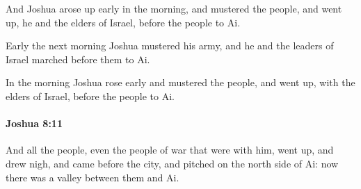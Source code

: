 			\begin{versebox}
					\item[BHS] 
					\item[ASV] And Joshua arose up early in the morning, and mustered the people, and went up, he and the elders of Israel, before the people to Ai.
					\item[NIV] Early the next morning Joshua mustered his army, and he and the leaders of Israel marched before them to Ai.
					\item[NRSV] In the morning Joshua rose early and mustered the people, and went up, with the elders of Israel, before the people to Ai.
			\end{versebox}

		\paragraph{Joshua 8:11} %
			\label{JOSHUA-8-11}

			And all the people, even the people of war that were with him, went up, and drew nigh, and came before the city, and pitched on the north side of Ai: now there was a valley between them and Ai.

